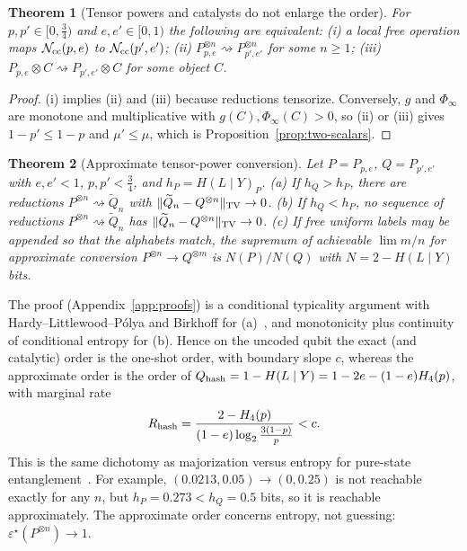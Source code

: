 \documentclass[11pt,a4paper]{article}
\theoremstyle{plain}
\newtheorem{theorem}{Theorem}[section]
\theoremstyle{definition}
\theoremstyle{remark}
\newcommand{\err}{\varepsilon^{\star}}
\newcommand{\Ncc}{\mathcal{N}_{\rm cc}}
\newcommand{\red}{\rightsquigarrow}
\begin{document}
\begin{theorem}[Tensor powers and catalysts do not enlarge the order]\label{thm:exact-tensor}
For $p,p'\in[0,\tfrac34)$ and $e,e'\in[0,1)$ the following are equivalent: (i) a local free operation maps $\Ncc(p,e)$ to $\Ncc(p',e')$; (ii) $P_{p,e}^{\otimes n}\red P_{p',e'}^{\otimes n}$ for some $n\ge1$; (iii) $P_{p,e}\otimes C\red P_{p',e'}\otimes C$ for some object $C$.
\end{theorem}
\begin{proof}
(i) implies (ii) and (iii) because reductions tensorize. Conversely, $g$ and $\Phi_\infty$ are monotone and multiplicative with $g(C),\Phi_\infty(C)>0$, so (ii) or (iii) gives $1-p'\le1-p$ and $\mu'\le\mu$, which is Proposition~\ref{prop:two-scalars}.
\end{proof}

\begin{theorem}[Approximate tensor-power conversion]\label{thm:approx-tensor}
Let $P=P_{p,e}$, $Q=P_{p',e'}$ with $e,e'<1$, $p,p'<\tfrac34$, and $h_P=H(L\mid Y)_P$.
(a) If $h_Q>h_P$, there are reductions $P^{\otimes n}\red\widetilde Q_n$ with $\|\widetilde Q_n-Q^{\otimes n}\|_{\rm TV}\to0$.
(b) If $h_Q<h_P$, no sequence of reductions $P^{\otimes n}\red\widetilde Q_n$ has $\|\widetilde Q_n-Q^{\otimes n}\|_{\rm TV}\to0$.
(c) If free uniform labels may be appended so that the alphabets match, the supremum of achievable $\lim m/n$ for approximate conversion $P^{\otimes n}\to Q^{\otimes m}$ is $N(P)/N(Q)$ with $N=2-H(L\mid Y)$ bits.
\end{theorem}

\noindent The proof (Appendix~\ref{app:proofs}) is a conditional typicality argument with Hardy--Littlewood--P\'olya and Birkhoff for (a)~\cite{MarshallOlkin}, and monotonicity plus continuity of conditional entropy for (b). Hence on the uncoded qubit the exact (and catalytic) order is the one-shot order, with boundary slope $c$, whereas the approximate order is the order of $Q_{\rm hash}=1-H(L\mid Y)=1-2e-(1-e)H_4(p)$, with marginal rate
\[
R_{\rm hash}=\frac{2-H_4(p)}{(1-e)\log_2\frac{3(1-p)}{p}}<c.
\]
This is the same dichotomy as majorization versus entropy for pure-state entanglement~\cite{Nielsen}. For example, $(0.0213,0.05)\to(0,0.25)$ is not reachable exactly for any $n$, but $h_P=0.273<h_Q=0.5$ bits, so it is reachable approximately. The approximate order concerns entropy, not guessing: $\err(P^{\otimes n})\to1$.
\end{document}
